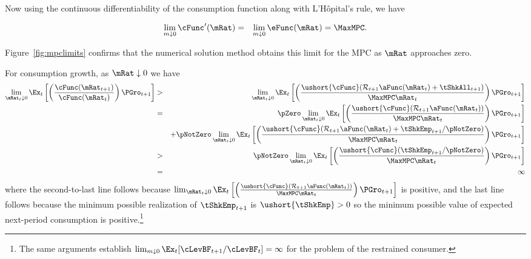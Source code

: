 \documentclass[titlepage]{\econtex}\providecommand{\texname}{BufferStockTheory}
\begin{document}
{Now using the continuous differentiability of the consumption function
along with L'H\^opital's rule, we have
\begin{comment}
\begin{eqnarray*}
    \eFunc^{\prime}(\mRat) & = & \mRat^{-1} \cFunc^{\prime}(\mRat) - \mRat^{-2} \cFunc(\mRat)
\\ \mRat \eFunc^{\prime}(\mRat) & = & \cFunc^{\prime}(\mRat) - \cFunc(\mRat)/\mRat
\\ \cFunc^{\prime}(\mRat) & = & \eFunc(\mRat)+ \mRat \eFunc^{\prime}(\mRat)
\end{eqnarray*}
and since $0<\eFunc(\mRat)<1$ we have
\end{comment}
\begin{eqnarray}
  \lim_{m \downarrow 0} \cFunc^{\prime}(\mRat) & = & \lim_{m \downarrow 0}
  \eFunc(\mRat) = \MaxMPC. \nonumber
\end{eqnarray}

Figure~\ref{fig:mpclimits} confirms that the numerical solution method
obtains this limit for the MPC as $\mRat$ approaches zero.

For consumption growth, as $\mRat \downarrow 0$ we have
\begin{eqnarray*}
\lim_{\mRat_{t} \downarrow 0} \Ex_{t}\left[\left(\frac{\cFunc({\mRat}_{t+1})}{\cFunc(\mRat_t)}\right){\PGro}_{t+1}\right]
& > & \lim_{\mRat_{t} \downarrow 0} \Ex_{t}\left[\left(\frac{\ushort{\cFunc}({\mathcal{\mathcal{R}}}_{t+1}\aFunc(\mRat_{t})+{%
\tShkAll}_{t+1})}{\MaxMPC \mRat_{t}}\right){\PGro}_{t+1}\right]  \notag \\
& = & \phantom{+}\pZero \lim_{\mRat_{t} \downarrow 0} \Ex_{t}\left[\left(\frac{\ushort{\cFunc}({\mathcal{\mathcal{R}}}_{t+1}\aFunc(\mRat_{t}))}{\MaxMPC \mRat_{t}}\right){\PGro}_{t+1}\right] \\
& & + \pNotZero \lim_{\mRat_{t} \downarrow 0}  \Ex_{t}\left[\left(\frac{\ushort{\cFunc}({\mathcal{\mathcal{R}}}_{t+1}\aFunc(\mRat_{t})+
\tShkEmp_{t+1}/\pNotZero)}{\MaxMPC \mRat_{t}}\right){\PGro}_{t+1}\right]  \\\notag
& > & \pNotZero \lim_{\mRat_{t} \downarrow 0} \Ex_{t}\left[\left(\frac{\ushort{\cFunc}(
\tShkEmp_{t+1}/\pNotZero)}{\MaxMPC \mRat_{t}}\right){\PGro}_{t+1}\right] \\
& = & \infty \nonumber
\end{eqnarray*}
where the second-to-last line follows because  $\lim_{\mRat_{t} \downarrow 0} \Ex_{t}\left[\left(\frac{\ushort{\cFunc}({\mathcal{\mathcal{R}}}_{t+1}\aFunc(\mRat_{t}))}{\MaxMPC \mRat_{t}}\right){\PGro}_{t+1}\right]$ is positive, and the last line follows because the minimum possible realization of $\tShkEmp_{t+1}$ is $\ushort{\tShkEmp}>0$ so the minimum possible value of expected next-period consumption is positive.\footnote{
The same arguments establish $\lim_{m \downarrow 0} \Ex_{t}[\cLevBF_{t+1}/\cLevBF_{t}] = \infty$
for the problem of the restrained consumer.%
}

}
\end{document}
